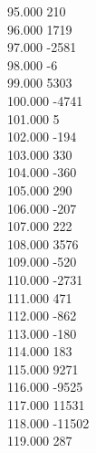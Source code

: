 { 95.000	210 \\
 96.000	1719 \\
 97.000	-2581 \\
 98.000	-6 \\
 99.000	5303 \\
 100.000	-4741 \\
 101.000	5 \\
 102.000	-194 \\
 103.000	330 \\
 104.000	-360 \\
 105.000	290 \\
 106.000	-207 \\
 107.000	222 \\
 108.000	3576 \\
 109.000	-520 \\
 110.000	-2731 \\
 111.000	471 \\
 112.000	-862 \\
 113.000	-180 \\
 114.000	183 \\
 115.000	9271 \\
 116.000	-9525 \\
 117.000	11531 \\
 118.000	-11502 \\
 119.000	287 \\
}
